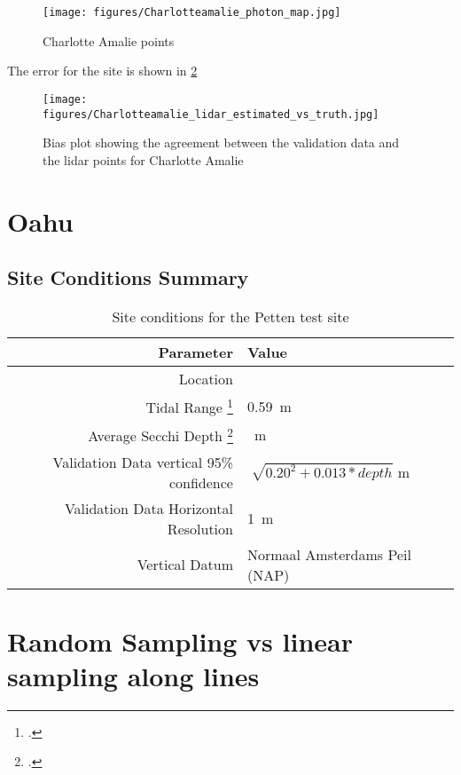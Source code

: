 \begin{figure}[htbp]
    \centering
    \texttt{[image: figures/Charlotteamalie\_photon\_map.jpg]}
    \caption{Charlotte Amalie points}
    \label{fig:point-map-charlotteamalie}
\end{figure}

The error for the site is shown in \ref{fig:charlotteamalie-lidar-bias}

\begin{figure}[htbp]
    \centering
    \texttt{[image: figures/Charlotteamalie\_lidar\_estimated\_vs\_truth.jpg]}
    \caption{Bias plot showing the agreement between the validation data and the lidar points for Charlotte Amalie}
    \label{fig:charlotteamalie-lidar-bias}
\end{figure}


\section{Oahu}

\subsection{Site Conditions Summary}
\begin{table}[htbp]
    \begin{minipage}{0.5\textwidth}
        \centering\begin{tabular}{r l }
            Parameter                                                 & \textbf{Value}                      \\
            \hline
            Location                                                  &                                     \\
            Tidal Range \footcite{tidal_data_reanalysis2022}          & \qty{0.59}{m}                       \\
            Average Secchi Depth \footcite{ACRI-STGlobColourTeam2020} & \qty{}{m}                           \\
            Validation Data vertical 95\% confidence                  & $\sqrt[]{0.20^2 + 0.013 * depth}$ m \\
            Validation Data Horizontal Resolution                     & \qty{1}{m}                          \\
            Vertical Datum                                            & Normaal Amsterdams Peil (NAP)       \\
        \end{tabular}
    \end{minipage}
    \caption{Site conditions for the Petten test site}
    \label{table:Oahusitestats}
\end{table}

\section{Random Sampling vs linear sampling along lines}
